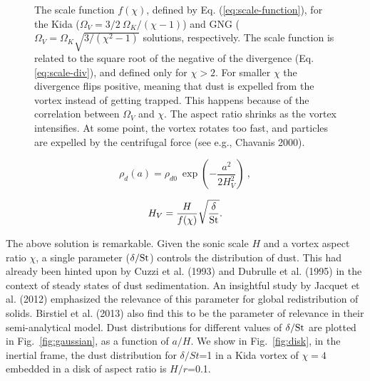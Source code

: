 \documentclass[apj]{emulateapj}
\newcommand{\Eq}[1]{Eq. (\ref{#1})}
\newcommand{\eq}[1]{\Eq{#1}}
\newcommand{\eqp}[1]{(Eq. \ref{#1})}
\newcommand{\Fig}[1]{Fig.~\ref{#1}}
\newcommand{\fig}[1]{\Fig{#1}}
\newcommand{\beq}{\begin{equation}}
\newcommand{\eeq}{\end{equation}}
\begin{document}
\begin{figure}
  \begin{center}
  \end{center}
\caption[]{The scale function $f(\chi)$, defined by
  \eq{eq:scale-function}, for the Kida ($\varOmega_V=3/2
  \ \varOmega_K/(\chi-1)$) and GNG ($\varOmega_V=\varOmega_K
  \sqrt{3/(\chi^2-1)}$ solutions, respectively. The scale function is
  related to the square root of the negative of the divergence
  \eqp{eq:scale-div}, and defined only for $\chi>2$. For smaller $\chi$ the
  divergence flips positive, meaning that dust is expelled from the
  vortex instead of getting trapped. This happens because of the
  correlation between $\varOmega_V$ and $\chi$. The aspect ratio shrinks
  as the vortex intensifies. At some point, the vortex rotates too
  fast, and particles are expelled by the centrifugal force (see e.g.,
  Chavanis 2000).}
 \label{fig:scale-function}
\end{figure}


\beq
\rho_d(a) = \rho_{d0} \ \exp\left(-\frac{a^2}{2H_V^2}\right) \ ,
\label{eq:gen_axi}
\eeq

\beq
 H_V = \frac{H}{f(\chi)} \sqrt{\frac{\delta}{\rm St}}. 
\label{eq:hv}
\eeq

The above solution is remarkable. Given the sonic scale $H$ and a vortex 
aspect ratio $\chi$, a single parameter ($\delta/{\rm St}$) controls the 
distribution of dust. This had already been 
hinted upon by Cuzzi et al. (1993) and Dubrulle et al. (1995) 
in the context of steady states of dust sedimentation. An insightful study by 
Jacquet et al. (2012) emphasized the relevance of this parameter for 
global redistribution of solids. Birstiel et al. (2013) also find this to be 
the parameter of relevance in their semi-analytical model. Dust distributions 
for different values of $\delta/{\rm St}$ are plotted in \fig{fig:gaussian}, as a 
function of $a/H$. We show in \fig{fig:disk}, in the inertial frame, 
the dust distribution for $\delta/St$=1 in a Kida vortex of $\chi=4$ embedded in a 
disk of aspect ratio is $H/r$=0.1. 
\end{document}
